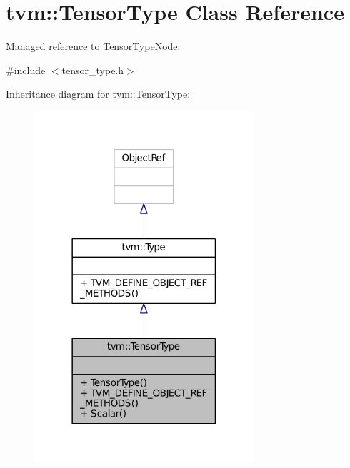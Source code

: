 \hypertarget{classtvm_1_1TensorType}{}\section{tvm\+:\+:Tensor\+Type Class Reference}
\label{classtvm_1_1TensorType}


Managed reference to \hyperlink{classtvm_1_1TensorTypeNode}{Tensor\+Type\+Node}.  




{\ttfamily \#include $<$tensor\+\_\+type.\+h$>$}



Inheritance diagram for tvm\+:\+:Tensor\+Type\+:
\nopagebreak
\begin{figure}[H]
\begin{center}
\leavevmode
\includegraphics[width=230pt]{classtvm_1_1TensorType__inherit__graph}
\end{center}
\end{figure}



